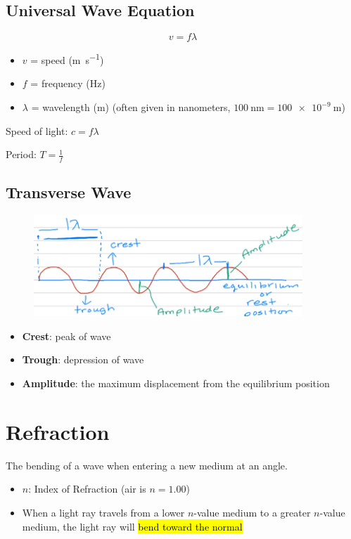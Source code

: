 \documentclass[a4paper,12pt]{article}
\begin{document}
\subsection{Universal Wave Equation}
\Large $$v = f\lambda$$ \normalsize
\begin{itemize}
    \item{$v$ = speed (\si{\m\per\s})}
    \item{$f$ = frequency (\si{\Hz})}
    \item{$\lambda$ = wavelength (\si{\m}) (often given in nanometers, $\SI{100}{\nano\m} = \SI{100e-9}{\m}$)}
\end{itemize}

Speed of light: $c = f\lambda$

Period: $T = \frac{1}{f}$

\subsection{Transverse Wave}
\begin{figure}[H]
    \centering
    \includegraphics[width=0.9\textwidth]{transverse}
\end{figure}
\begin{itemize}
    \item{\textbf{Crest}: peak of wave}
    \item{\textbf{Trough}: depression of wave}
    \item{\textbf{Amplitude}: the maximum displacement from the equilibrium position}
\end{itemize}

\section{Refraction}
The bending of a wave when entering a new medium at an angle.

\begin{itemize}
    \item{$n$: Index of Refraction (air is $n = \num{1.00}$)}
    \item{When a light ray travels from a lower $n$-value medium to a greater $n$-value medium, the light ray will \hl{bend toward the normal}}
\end{itemize}
\end{document}
